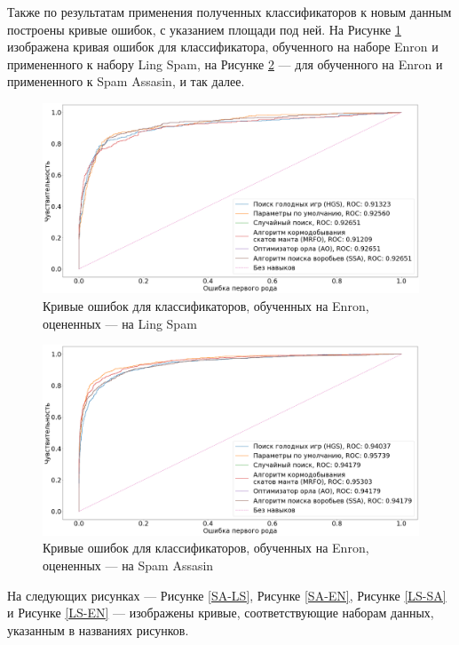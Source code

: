 Также по результатам применения полученных классификаторов к новым данным построены кривые ошибок, с указанием 
площади под ней. На Рисунке \ref{EN-LS} изображена кривая ошибок для классификатора, обученного на наборе Enron и 
примененного к набору Ling Spam, на Рисунке \ref{EN-SA} — для обученного на Enron и примененного к Spam Assasin, и так 
далее.

\begin{figure}[H]
    \centering
    \includegraphics[width=165mm]{static/EN-LS.png}
    \caption{Кривые ошибок для классификаторов, обученных на Enron, оцененных — на Ling Spam}
    \label{EN-LS}
\end{figure}

\begin{figure}[H]
    \centering
    \includegraphics[width=165mm]{static/EN-SA.png}
    \caption{Кривые ошибок для классификаторов, обученных на Enron, оцененных — на Spam Assasin}
    \label{EN-SA}
\end{figure}

На следующих рисунках — Рисунке \ref{SA-LS}, Рисунке \ref{SA-EN}, Рисунке \ref{LS-SA} и Рисунке \ref{LS-EN} — 
изображены кривые, соответствующие наборам данных, указанным в названиях рисунков.

